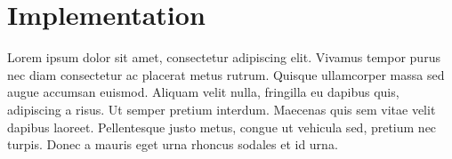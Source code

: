\chapter{Implementation}

Lorem ipsum dolor sit amet, consectetur adipiscing elit. Vivamus tempor purus nec diam consectetur ac placerat metus rutrum. Quisque ullamcorper massa sed augue accumsan euismod. Aliquam velit nulla, fringilla eu dapibus quis, adipiscing a risus. Ut semper pretium interdum. Maecenas quis sem vitae velit dapibus laoreet. Pellentesque justo metus, congue ut vehicula sed, pretium nec turpis. Donec a mauris eget urna rhoncus sodales et id urna.



